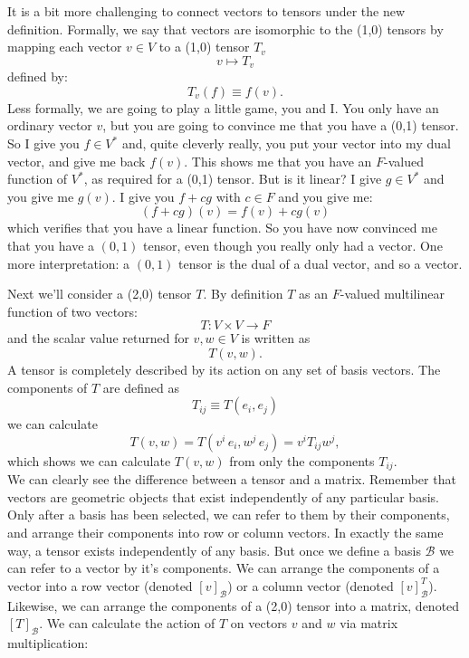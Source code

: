 \documentclass[12pt]{article}
\begin{document}
\noindent
It is a bit more challenging to connect vectors to tensors under the new definition.
Formally, we say that vectors are isomorphic to the
(1,0) tensors by mapping each vector $v \in V$ to a (1,0) tensor $T_v$
$$v \mapsto T_v$$
defined by:
$$ T_v(f) \equiv f(v).$$
Less formally, we are going to play a little game, you and I.  You
only have an ordinary vector $v$, but you are going to convince me
that you have a (0,1) tensor.  So I give you $f \in V^*$ and, quite
cleverly really, you put your vector into my dual vector, and give me
back $f(v)$.  This shows me that you have an $F$-valued function of $V^*$,
as required for a (0,1) tensor.  But is it linear?  I give $g \in V^*$
and you give me $g(v)$.  I give you $f+cg$ with $c \in F$ and you give
me:
$$(f+cg)(v) = f(v) + c g(v)$$
which verifies that you have a linear function.  So you have now convinced
me that you have a $(0,1)$ tensor, even though you really only had a vector.
One more interpretation: a $(0,1)$ tensor is the dual of a dual
vector, and so a vector.

Next we'll consider a (2,0) tensor $T$.  By definition $T$ as an
$F$-valued multilinear function of two vectors:
\begin{displaymath}
T:V \times V \to F
\end{displaymath}
and the scalar value returned for $v, w \in V$ is written as
$$T(v, w).$$
A tensor is completely described by its action on any set of basis
vectors.  The components of $T$ are defined as
$$T_{ij} \equiv T(e_i, e_j)$$
we can calculate
$$T(v,w) = T(v^i \, e_i, w^j \, e_j) = v^i T_{ij} w^j,$$
which shows we can calculate $T(v,w)$ from only the components $T_{ij}$.\\[3pt]

\noindent
We can clearly see the difference between a tensor and a matrix.
Remember that vectors are geometric objects that exist independently
of any particular basis.  Only after a basis has been selected, we can
refer to them by their components, and arrange their components into
row or column vectors.  In exactly the same way, a tensor exists
independently of any basis.  But once we define a basis $\mathcal{B}$
we can refer to a vector by it's components.  We can arrange the
components of a vector into a row vector (denoted $[v]_\mathcal{B}$)
or a column vector (denoted $[v]^T_{\mathcal{B}}$).  Likewise, we can
arrange the components of a (2,0) tensor into a matrix, denoted
$[T]_{\mathcal{B}}$.  We can calculate the action of $T$ on vectors
$v$ and $w$ via matrix multiplication:
\end{document}
